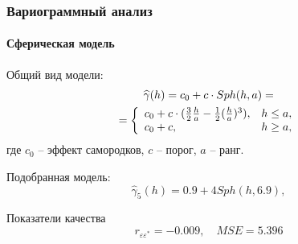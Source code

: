 \documentclass{beamer}
\begin{document}
\begin{frame}
  \frametitle{Вариограммный анализ}
  \framesubtitle{Сферическая модель}
  \begin{multicols}{2}
    \begin{small}
      Общий вид модели:
      \begin{equation}\begin{gathered}
      \label{eq:sph}
        \widehat{\gamma}(h) = c_0 + c \cdot Sph(h, a) = \\ = \left\{
        \begin{array}{l l}
          c_0 + c \cdot (\frac{3}{2} \frac{h}{a} - \frac{1}{2}(\frac{h}{a})^3), & h \le a, \\
          c_0 + c, & h \geq a,
        \end{array} \right.
      \end{gathered}\end{equation}
      где $ c_0 $ -- эффект самородков, $ c $ -- порог, $ a $ -- ранг.
      
      \medskip
      
      Подобранная модель:
      \begin{equation}
        \label{eq:gamma5}
        \widehat{\gamma}_5(h) = 0.9 + 4 Sph(h, 6.9),
      \end{equation}
      
      Показатели качества
      \begin{equation*}
        r_{\varepsilon\varepsilon^{*}} = -0.009, \quad MSE = 5.396
      \end{equation*}
    \end{small}
    

\end{multicols}
\end{frame}
\end{document}
